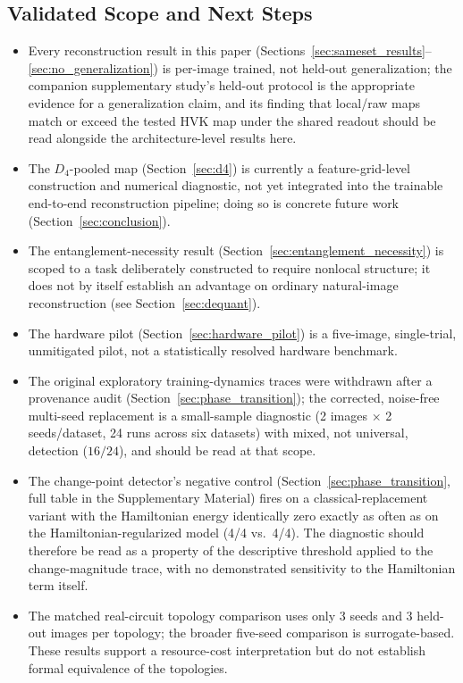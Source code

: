 \documentclass[11pt]{article}
\begin{document}
\subsection{Validated Scope and Next Steps}
\label{sec:limitations}
\begin{itemize}
    \item Every reconstruction result in this paper (Sections~\ref{sec:sameset_results}--\ref{sec:no_generalization}) is per-image trained, not held-out generalization; the companion supplementary study's held-out protocol is the appropriate evidence for a generalization claim, and its finding that local/raw maps match or exceed the tested HVK map under the shared readout should be read alongside the architecture-level results here.
    \item The $D_4$-pooled map (Section~\ref{sec:d4}) is currently a feature-grid-level construction and numerical diagnostic, not yet integrated into the trainable end-to-end reconstruction pipeline; doing so is concrete future work (Section~\ref{sec:conclusion}).
    \item The entanglement-necessity result (Section~\ref{sec:entanglement_necessity}) is scoped to a task deliberately constructed to require nonlocal structure; it does not by itself establish an advantage on ordinary natural-image reconstruction (see Section~\ref{sec:dequant}).
    \item The hardware pilot (Section~\ref{sec:hardware_pilot}) is a five-image, single-trial, unmitigated pilot, not a statistically resolved hardware benchmark.
    \item The original exploratory training-dynamics traces were withdrawn after a provenance audit (Section~\ref{sec:phase_transition}); the corrected, noise-free multi-seed replacement is a small-sample diagnostic (2 images $\times$ 2 seeds/dataset, 24 runs across six datasets) with mixed, not universal, detection ($16/24$), and should be read at that scope.
    \item The change-point detector's negative control (Section~\ref{sec:phase_transition}, full table in the Supplementary Material) fires on a classical-replacement variant with the Hamiltonian energy identically zero exactly as often as on the Hamiltonian-regularized model (4/4 vs.\ 4/4). The diagnostic should therefore be read as a property of the descriptive threshold applied to the change-magnitude trace, with no demonstrated sensitivity to the Hamiltonian term itself.
    \item The matched real-circuit topology comparison uses only 3 seeds and 3 held-out images per topology; the broader five-seed comparison is surrogate-based. These results support a resource-cost interpretation but do not establish formal equivalence of the topologies.
\end{itemize}
\end{document}

